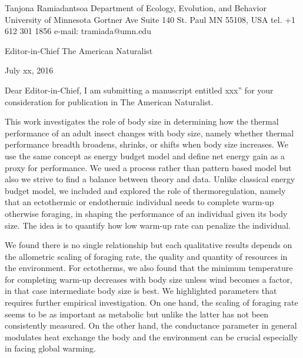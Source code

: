 Tanjona Ramiadantsoa \newline
Department of Ecology, Evolution, and Behavior \newline
University of Minnesota  Gortner Ave Suite 140 \newline
St. Paul MN 55108, USA \newline
tel. +1 612 301 1856 \newline
e-mail: tramiada@umn.edu \newline


Editor-in-Chief \newline
The American Naturalist  \newline \newline

July xx, 2016 \newline \newline

Dear Editor-in-Chief, \newline
I am submitting a manuscript entitled xxx” for your consideration for publication in The American Naturalist.

This work investigates the role of body size in determining how the thermal performance of an adult insect changes with body size, namely whether thermal performance breadth broadens, shrinks, or shifts when body size increases.
We use the same concept as energy budget model and define net energy gain as a proxy for performance.
We used a process rather than pattern based model but also we strive to find a balance between theory and data.
Unlike classical energy budget model, we included and explored the role of thermoregulation, namely that an ectothermic or endothermic individual needs to complete warm-up otherwise foraging, in shaping the performance of an individual given its body size.
The idea is to quantify how low warm-up rate can penalize the individual.

We found there is no single relationship but each qualitative results depends on the allometric scaling of foraging rate, the quality and quantity of resources in the environment.
For ectotherms, we also found that the minimum temperature for completing warm-up decreases with body size unless wind becomes a factor, in that case intermediate body size is best.
We highlighted parameters that requires further empirical investigation.
On one hand, the scaling of foraging rate seems to be as important as metabolic but unlike the latter has not been consistently measured.
On the other hand, the conductance parameter in general modulates heat exchange the body and the environment can be crucial especially in facing global warming.

